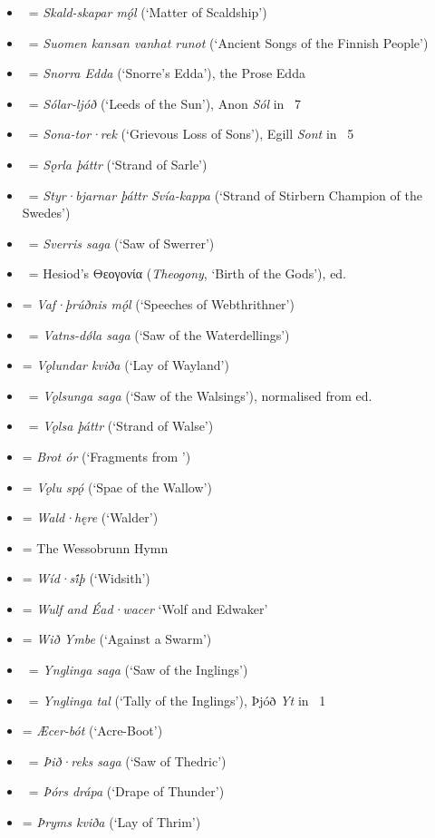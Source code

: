 \begin{itemize}
	\item \Skaldskaparmal\ = \emph{Skald-skapar mǫ́l} (‘Matter of Scaldship’)
	\item \Skvr\ = \emph{Suomen kansan vanhat runot} (‘Ancient Songs of the Finnish People’)
	\item \SnorraEdda\ = \emph{Snorra Edda} (‘Snorre’s Edda’), the Prose Edda
	\item \Solarljod\ = \emph{Sólar-ljóð} (‘Leeds of the Sun’), Anon \emph{Sól} in \Skp\ 7
	\item \Sonatorrek\ = \emph{Sona-tor·rek} (‘Grievous Loss of Sons’), Egill \emph{Sont} in \Skp\ 5
	\item \Sorlathattr\ = \emph{Sǫrla þáttr} (‘Strand of Sarle’)
	\item \StyrbjarnarThattr\ = \emph{Styr·bjarnar þáttr Svía-kappa} (‘Strand of Stirbern Champion of the Swedes’)
	\item \Sverrissaga\ = \emph{Sverris saga} (‘Saw of Swerrer’)
	\item \Theogony\ = Hesiod’s \textgreek{Θεογονία} (\emph{Theogony}, ‘Birth of the Gods’), \textcite{West1966} ed.
	\item \textbf{} = \emph{Vaf·þrúðnis mǫ́l} (‘Speeches of Webthrithner’)
	\item \Vatnsdola\ = \emph{Vatns-dǿla saga} (‘Saw of the Waterdellings’)
	\item \textbf{} = \emph{Vǫlundar kviða} (‘Lay of Wayland’)
	\item \VolsungaSaga\ = \emph{Vǫlsunga saga} (‘Saw of the Walsings’), normalised from \textcite{Olsen1908} ed.
	\item \Volsathattr\ = \emph{Vǫlsa þáttr} (‘Strand of Walse’)
	\item \textbf{} = \emph{Brot ór \VolsungaSaga} (‘Fragments from \VolsungaSaga’)
	\item \textbf{} = \emph{Vǫlu spǫ́} (‘Spae of the Wallow’)
	\item \textbf{} = \emph{Wald·hęre} (‘Walder’)
	\item \textbf{} = The Wessobrunn Hymn
	\item \textbf{} = \emph{Wíd·si̇́þ} (‘Widsith’)
	\item \textbf{} = \emph{Wulf and Éad·wacer} ‘Wolf and Edwaker’
	\item \textbf{} = \emph{Wið Ymbe} (‘Against a Swarm’)
	\item \YnglingaSaga\ = \emph{Ynglinga saga} (‘Saw of the Inglings’)
	\item \Ynglingatal\ = \emph{Ynglinga tal} (‘Tally of the Inglings’), Þjóð \emph{Yt} in \Skp\ 1
	\item \textbf{} = \emph{Æcer-bót} (‘Acre-Boot’)
	\item \ThidreksSaga\ = \emph{Þið·reks saga} (‘Saw of Thedric’)
	\item \Thorsdrapa\ = \emph{Þórs drápa} (‘Drape of Thunder’)
	\item \textbf{} = \emph{Þryms kviða} (‘Lay of Thrim’)
\end{itemize}%


